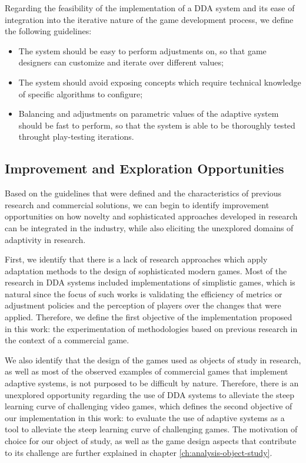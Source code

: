 Regarding the feasibility of the implementation of a DDA system and its ease of integration into the iterative nature of the game development process, we define the following guidelines:
\begin{itemize}
    \item{The system should be easy to perform adjustments on, so that game designers can customize and iterate over different values;}
    \item{The system should avoid exposing concepts which require technical knowledge of specific algorithms to configure;}
    \item{Balancing and adjustments on parametric values of the adaptive system should be fast to perform, so that the system is able to be thoroughly tested throught play-testing iterations.}
\end{itemize}

\subsection{Improvement and Exploration Opportunities}

Based on the guidelines that were defined and the characteristics of previous research and commercial solutions, we can begin to identify improvement opportunities on how novelty and sophisticated approaches developed in research can be integrated in the industry, while also eliciting the unexplored domains of adaptivity in research.

First, we identify that there is a lack of research approaches which apply adaptation methods to the design of sophisticated modern games. Most of the research in DDA systems included implementations of simplistic games, which is natural since the focus of such works is validating the efficiency of metrics or adjustment policies and the perception of players over the changes that were applied. Therefore, we define the first objective of the implementation proposed in this work: the experimentation of methodologies based on previous research in the context of a commercial game.

We also identify that the design of the games used as objects of study  in research, as well as most of the observed examples of commercial games that implement adaptive systems, is not purposed to be difficult by nature. Therefore, there is an unexplored opportunity regarding the use of DDA systems to alleviate the steep learning curve of challenging video games, which defines the second objective of our implementation in this work: to evaluate the use of adaptive systems as a tool to alleviate the steep learning curve of challenging games. The motivation of choice for our object of study, as well as the game design aspects that contribute to its challenge are further explained in chapter \ref{ch:analysis-object-study}.


